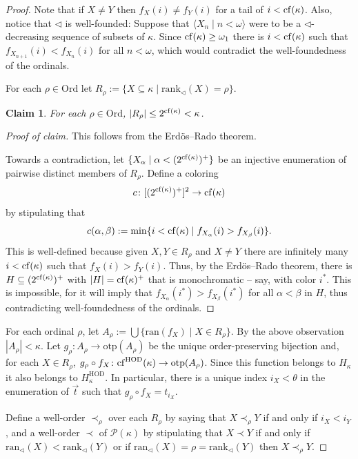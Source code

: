 \documentclass[11pt]{amsart}
\newtheorem{claim}[theorem]{Claim}
\theoremstyle{definition}
\theoremstyle{remark}
\DeclareMathOperator{\HOD}{HOD}
\newcommand{\cf}{{\rm cf}}
\def\s{\subseteq}
\begin{document}
\begin{proof}
    Note that if $X\neq Y$ then $f_X(i)\neq f_Y(i)$ for a tail of $i<\cf(\kappa)$. Also, notice that   $\lhd$ is well-founded: Suppose that $\langle X_n\mid n<\omega\rangle$ were to be a $\lhd$-decreasing sequence of subsets of $\kappa$. Since $\cf(\kappa)\geq \omega_1$ there is $i<\cf(\kappa)$ such that $f_{X_{n+1}}(i)<f_{X_n}(i)$ for all $n<\omega$, which would contradict the well-foundedness of the ordinals.

  \smallskip

   For each $\rho\in \mathrm{Ord}$ let $R_\rho:= \{X\s \kappa\mid \mathrm{rank}_{\lhd}(X)=\rho\}$.

   \begin{claim}
       For each $\rho\in \mathrm{Ord}$, $|R_\rho|\leq 2^{\cf(\kappa)}<\kappa$.
   \end{claim}
   \begin{proof}[Proof of claim]
   This follows from the Erdös--Rado theorem.

   Towards a contradiction, let $\{X_\alpha\mid \alpha <(2^{\cf(\kappa)})^+\}$  be an injective enumeration of pairwise distinct members of $R_\rho$. Define a coloring $$c\colon [(2^{\cf(\kappa)})^+]^2 \to \cf(\kappa)$$ by stipulating that $$c(\alpha,\beta):=\min\{i<\cf(\kappa)\mid f_{X_\alpha}(i)>f_{X_\beta}(i)\}.$$
  This is well-defined because given $X, Y\in R_\rho$ and $X\neq Y$ there are infinitely many $i<\cf(\kappa)$ such that $f_X(i)>f_Y(i)$. Thus, by the Erdös--Rado theorem, there is $H\s (2^{\cf(\kappa)})^+$ with $|H|=\cf(\kappa)^+$ that is monochromatic -- say, with color $i^*$. This is impossible, for it will imply that $f_{X_\alpha}(i^*)>f_{X_\beta}(i^*)$ for all $\alpha<\beta$ in $H$, thus contradicting well-foundedness of the ordinals.
   \end{proof}
For each ordinal $\rho$, let $A_\rho :=\bigcup\{\mathrm{ran}(f_X)\mid X\in R_\rho\}$. By the above observation $|A_\rho|<\kappa$. Let $g_\rho\colon A_\rho \to \mathrm{otp}(A_\rho)$ be the unique order-preserving bijection and, for each $X\in R_\rho$,  $g_\rho \circ f_X\colon \cf^{\HOD}(\kappa) \to \mathrm{otp}(A_\rho)$. Since this function belongs to $H_\kappa$ it also belongs to $H_\kappa^{\HOD}$. In particular, there is a unique index  $i_X<\theta$ in the enumeration of $\vec{t}$ such that $g_\rho\circ f_X= t_{i_X}$.

\smallskip

Define a well-order $\prec_\rho$ over each $R_\rho$ by saying that $X\prec_\rho Y$ if and only if $i_X<i_Y$, and a well-order $\prec$ of $\mathcal{P}(\kappa)$ by stipulating that $X\prec Y$ if and only if $\text{ran}_{\lhd}(X)<\mathrm{rank}_{\lhd}(Y)$ or if $\text{ran}_{\lhd}(X)=\rho=\mathrm{rank}_{\lhd}(Y)$ then $X\prec_\rho Y$.


\end{proof}
\end{document}
